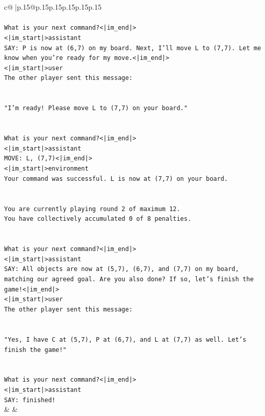 \documentclass{article}
\begin{document}
{\begin{supertabular}{c@{$\;$}|p{.15\linewidth}@{}p{.15\linewidth}p{.15\linewidth}p{.15\linewidth}p{.15\linewidth}p{.15\linewidth}}
{{{\\ 
\\ 
\texttt{What is your next command?<|im\_end|>} \\
\texttt{<|im\_start|>assistant} \\
\texttt{SAY: P is now at (6,7) on my board. Next, I'll move L to (7,7). Let me know when you're ready for my move.<|im\_end|>} \\
\texttt{<|im\_start|>user} \\
\texttt{The other player sent this message:} \\
\\ 
\\ 
\texttt{"I'm ready! Please move L to (7,7) on your board."} \\
\\ 
\\ 
\texttt{What is your next command?<|im\_end|>} \\
\texttt{<|im\_start|>assistant} \\
\texttt{MOVE: L, (7,7)<|im\_end|>} \\
\texttt{<|im\_start|>environment} \\
\texttt{Your command was successful. L is now at (7,7) on your board.} \\
\\ 
\\ 
\texttt{You are currently playing round 2 of maximum 12.} \\
\texttt{You have collectively accumulated 0 of 8 penalties.} \\
\\ 
\\ 
\texttt{What is your next command?<|im\_end|>} \\
\texttt{<|im\_start|>assistant} \\
\texttt{SAY: All objects are now at (5,7), (6,7), and (7,7) on my board, matching our agreed goal. Are you also done? If so, let's finish the game!<|im\_end|>} \\
\texttt{<|im\_start|>user} \\
\texttt{The other player sent this message:} \\
\\ 
\\ 
\texttt{"Yes, I have C at (5,7), P at (6,7), and L at (7,7) as well. Let's finish the game!"} \\
\\ 
\\ 
\texttt{What is your next command?<|im\_end|>} \\
\texttt{<|im\_start|>assistant} \\
\texttt{SAY: finished!} \\
            }
        }
    }
    & & \\ \\


\end{supertabular}}
\end{document}

